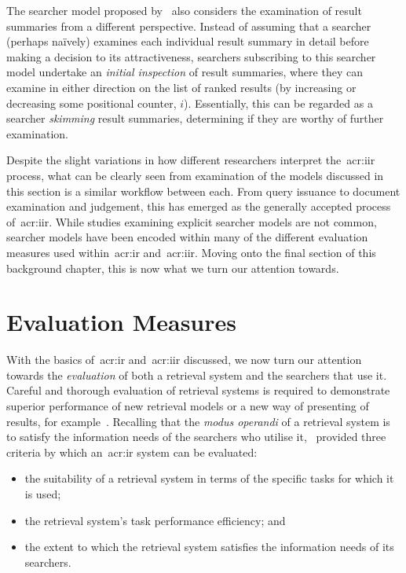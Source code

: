 
The searcher model proposed by~\cite{thomas2014modelling_behaviour} also considers the examination of result summaries from a different perspective. Instead of assuming that a searcher (perhaps na\"{i}vely) examines each individual result summary in detail before making a decision to its attractiveness, searchers subscribing to this searcher model undertake an \emph{initial inspection} of result summaries, where they can examine in either direction on the list of ranked results (by increasing or decreasing some positional counter, $i$). Essentially, this can be regarded as a searcher \emph{skimming} result summaries, determining if they are worthy of further examination.

Despite the slight variations in how different researchers interpret the~\gls{acr:iir} process, what can be clearly seen from examination of the models discussed in this section is a similar workflow between each. From query issuance to document examination and judgement, this has emerged as the generally accepted process of~\gls{acr:iir}. While studies examining explicit searcher models are not common, searcher models have been encoded within many of the different evaluation measures used within~\gls{acr:ir} and~\gls{acr:iir}. Moving onto the final section of this background chapter, this is now what we turn our attention towards.

\section{Evaluation Measures}\label{sec:ir_background:evaluation}
With the basics of~\gls{acr:ir} and~\gls{acr:iir} discussed, we now turn our attention towards the \emph{evaluation} of both a retrieval system and the searchers that use it. Careful and thorough evaluation of retrieval systems is required to demonstrate superior performance of new retrieval models or a new way of presenting of results, for example~\citep{manning2008ir}. Recalling that the \emph{modus operandi} of a retrieval system is to satisfy the information needs of the searchers who utilise it,~\cite{lancaster1968information} provided three criteria by which an~\gls{acr:ir} system can be evaluated:

\begin{itemize}
    \item{the suitability of a retrieval system in terms of the specific tasks for which it is used;}
    \item{the retrieval system's task performance efficiency; and}
    \item{the extent to which the retrieval system satisfies the information needs of its searchers.}
\end{itemize}

